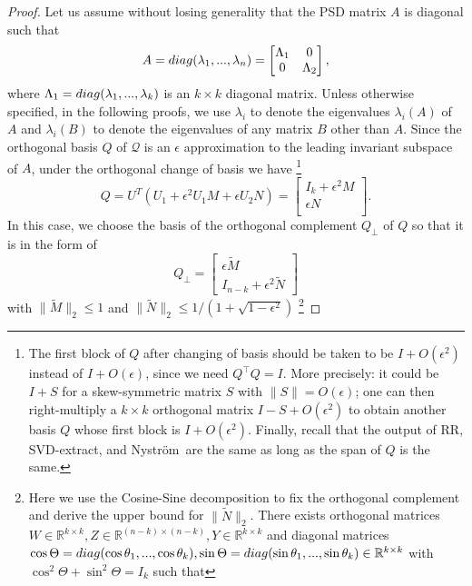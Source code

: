 \documentclass[10pt,a4paper]{amsart}
\def\Nystrom{Nystr{\"o}m}
\newcommand{\diag}{{\rm diag}}
\def\realR{\mathbb{R}}
\def\subspace{\mathcal{Q}}
\def\svdmethod{SVD-extract}
\begin{document}
\begin{proof}
Let us assume without losing generality that the PSD matrix $A$ is diagonal such that
\[
    A
    =
    \diag (\lambda_{1}, ..., \lambda_{n})
    =
    \begin{bmatrix}
        \Lambda_{1} & 0 \\
        0 & \Lambda_{2} \\
    \end{bmatrix},
\]
where $\Lambda_{1} = \diag(\lambda_1, ..., \lambda_k)$ is an $k \times k$ diagonal matrix. Unless otherwise specified, in the following proofs, we use $\lambda_i$ to denote the eigenvalues $\lambda_i(A)$ of $A$ and $\lambda_i(B)$ to denote the eigenvalues of any matrix $B$ other than $A$. Since the orthogonal basis $Q$ of $\subspace$ is an $\epsilon$ approximation to the leading invariant subspace of $A$, under the orthogonal change of basis we have \footnote{The first block of $Q$ after changing of basis should be taken to be $I + O(\epsilon^2)$ instead of $I + O(\epsilon)$, since we need $Q^\top Q = I$. More precisely: it could be $I+S$ for a skew-symmetric matrix $S$ with $\|S\|=O(\epsilon)$; one can then right-multiply a $k\times k$ orthogonal matrix $I-S+O(\epsilon^2)$ to obtain another basis $Q$ whose first block is $I + O(\epsilon^2)$. Finally, recall that the output of RR, \svdmethod, and \Nystrom\ are the same as long as the span of $Q$ is the same.
}
\begin{equation}
    \label{eq:transformed-Q-block-form}
    Q = U^T (U_1 + \epsilon^2 U_1 M + \epsilon U_2 N) =
    \begin{bmatrix}
        I_k + \epsilon^2 M \\
        \epsilon N \\
    \end{bmatrix}.
\end{equation}
In this case, we choose the basis of the orthogonal complement $Q_{\perp}$ of $Q$ so that it is in the form of
\[
    Q_{\perp} =
    \begin{bmatrix}
        \epsilon \widetilde{M} \\
        I_{n-k} + \epsilon^2 \widetilde{N}
    \end{bmatrix}
\]
with $\|\widetilde{M}\|_2 \leq 1$ and $\|\widetilde{N}\|_2 \leq 1 / (1 + \sqrt{1 - \epsilon^2})$ \footnote{Here we use the Cosine-Sine decomposition \cite{stewart1977perturbation} to fix the orthogonal complement and derive the upper bound for $\|\widetilde{N}\|_2$. There exists orthogonal matrices $W \in \realR^{k \times k}, Z \in \realR^{(n-k) \times (n-k)}, Y \in \realR^{k \times k}$ and diagonal matrices $\cos \Theta = \diag(\cos \theta_1, ..., \cos \theta_k), \sin \Theta = \diag(\sin \theta_1, ..., \sin \theta_k) \in \realR^{k \times k}$ with $\cos^2 \Theta + \sin^2 \Theta = I_k$ such that
}
\end{proof}
\end{document}
